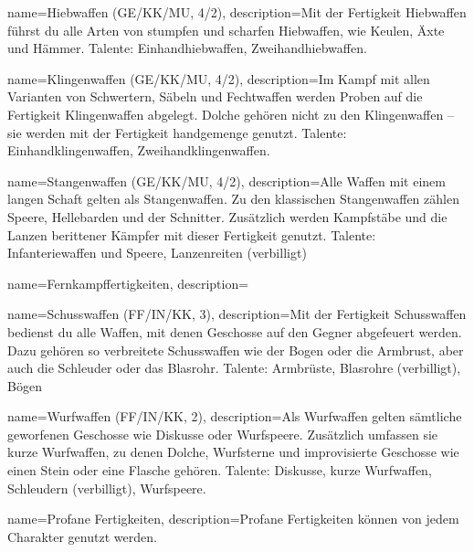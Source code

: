 {
    name={Hiebwaffen (GE/KK/MU, 4/2)},
    description={Mit der Fertigkeit Hiebwaffen führst du alle Arten von stumpfen und scharfen Hiebwaffen, wie Keulen, Äxte und Hämmer. Talente: Einhandhiebwaffen, Zweihandhiebwaffen.}}

{
    name={Klingenwaffen (GE/KK/MU, 4/2)},
    description={Im Kampf mit allen Varianten von Schwertern, Säbeln und Fechtwaffen werden Proben auf die Fertigkeit Klingenwaffen abgelegt. Dolche gehören nicht zu den Klingenwaffen – sie werden mit der Fertigkeit \gls{handgemenge} genutzt. Talente: Einhandklingenwaffen, Zweihandklingenwaffen.}}

{
    name={Stangenwaffen (GE/KK/MU, 4/2)},
    description={Alle Waffen mit einem langen Schaft gelten als Stangenwaffen. Zu den klassischen Stangenwaffen zählen Speere, Hellebarden und der Schnitter. Zusätzlich werden Kampfstäbe und die Lanzen berittener Kämpfer mit dieser Fertigkeit genutzt. Talente: Infanteriewaffen und Speere, Lanzenreiten (\gls{verbilligt})}}

{
    name={Fernkampffertigkeiten},
    description={}}

{
    name={Schusswaffen (FF/IN/KK, 3)},
    description={Mit der Fertigkeit Schusswaffen bedienst du alle Waffen, mit denen Geschosse auf den Gegner abgefeuert werden. Dazu gehören so verbreitete Schusswaffen wie der Bogen oder die Armbrust, aber auch die Schleuder oder das Blasrohr. Talente: Armbrüste, Blasrohre (verbilligt), Bögen}}

{
    name={Wurfwaffen (FF/IN/KK, 2)},
    description={Als Wurfwaffen gelten sämtliche geworfenen Geschosse wie Diskusse oder Wurfspeere. Zusätzlich umfassen sie kurze Wurfwaffen, zu denen Dolche, Wurfsterne und improvisierte Geschosse wie einen Stein oder eine Flasche gehören. Talente: Diskusse, kurze Wurfwaffen, Schleudern (\gls{verbilligt}), Wurfspeere.}}

{
    name={Profane Fertigkeiten},
    description={Profane Fertigkeiten können von jedem Charakter genutzt werden.}}

